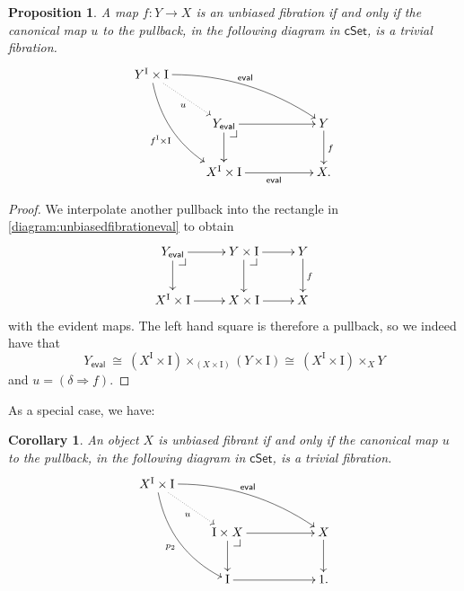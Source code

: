 \documentclass[12pt]{article}
\makeatletter
\newcommand{\cSet}{\ensuremath{\mathsf{cSet}}}
\newcommand{\ra}{\ensuremath{\rightarrow}}
\newcommand{\I}{\ensuremath{\mathrm{I}}}
\newtheorem{proposition}[theorem]{Proposition}
\newtheorem{corollary}[theorem]{Corollary}
\theoremstyle{remark}
\theoremstyle{definition}
\newcommand{\pbcorner}[1][dr]{\save*!/#1-1.2pc/#1:(-1,1)@^{|-}\restore}
\makeatother
\begin{document}
\begin{proposition}
A map $f : Y\ra X$ is an unbiased fibration if and only if the canonical map $u$ to the pullback, in the following diagram in $\cSet$, is a trivial fibration.
\begin{equation}\label{diagram:unbiasedfibrationeval}
\xymatrix{
Y^\I\times \I \ar@/^3ex/ [rrrd]^{\mathsf{eval}} \ar@/_3ex/ [rdd]_{f^\I\times \I} \ar@{..>}[rd]_{u}  && \\
& Y_\mathsf{eval} \pbcorner  \ar[d] \ar[rr] && Y \ar[d]^f \\
& X^\I \times \I \ar[rr]_{\mathsf{eval}} && X.
}
\end{equation}
\end{proposition}
\begin{proof}
We interpolate another pullback into the rectangle in \eqref{diagram:unbiasedfibrationeval} to obtain
\begin{equation}\label{diagram:unbiasedfibrationeval2}
\xymatrix{
 Y_\mathsf{eval} \pbcorner  \ar[d] \ar[r] & Y\times \I \ar[d] \pbcorner \ar[r] & Y \ar[d]^f \\
 X^\I \times \I \ar[r] & X\times \I \ar[r] & X
}
\end{equation}
with the evident maps. The left hand square is therefore a pullback, so we indeed have that 
\[
Y_\mathsf{eval}\ \cong\ (X^\I \times \I)\times_{(X\times \I)} (Y\times\I) \cong\ (X^\I \times \I)\times_{X} Y
\]
and $u = (\delta\Rightarrow\! f)$.
\end{proof}

As a special case, we have:
\begin{corollary}\label{cor:unbiasedfibrant}
An object $X$ is unbiased fibrant if and only if the canonical map $u$ to the pullback, in the following diagram in $\cSet$, is a trivial fibration.
\begin{equation}\label{diagram:unbiasedfibrationeval}
\xymatrix{
X^\I\times \I \ar@/^3ex/ [rrrd]^{\mathsf{eval}} \ar@/_3ex/ [rdd]_{p_2} \ar@{..>}[rd]_{u}  && \\
& \I\times X \pbcorner  \ar[d] \ar[rr] && X \ar[d] \\
& \I \ar[rr] && 1.
}
\end{equation}
\end{corollary}
\end{document}
